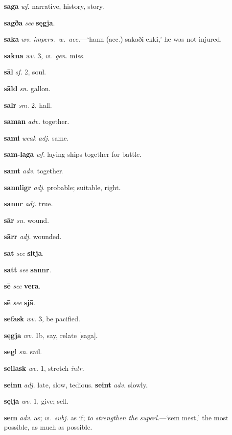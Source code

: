\documentclass[12pt,letterpaper]{book}
\begin{document}
\noindent
\textbf{saga} \textit{wf.} narrative, history, story.

\noindent
\textbf{sagða} \textit{} \textit{see} \textbf{sęgja}.

\noindent
\textbf{saka} \textit{wv.} \textit{impers.\ w.\ acc.}---`hann (acc.) sakaði
	ekki,' he was not injured.

\noindent
\textbf{sakna} \textit{wv.} 3, \textit{w.\ gen.} miss.

\noindent
\textbf{sāl} \textit{sf.} 2, soul.

\noindent
\textbf{sāld} \textit{sn.} gallon.

\noindent
\textbf{salr} \textit{sm.} 2, hall.

\noindent
\textbf{saman} \textit{adv.} together.

\noindent
\textbf{sami} \textit{weak adj.} same.

\noindent
\textbf{sam-laga} \textit{wf.} laying ships together for battle.

\noindent
\textbf{samt} \textit{adv.} together.

\noindent
\textbf{sannligr} \textit{adj.} probable; suitable, right.

\noindent
\textbf{sannr} \textit{adj.} true.

\noindent
\textbf{sār} \textit{sn.} wound.

\noindent
\textbf{sārr} \textit{adj.} wounded.

\noindent
\textbf{sat} \textit{} \textit{see} \textbf{sitja}.

\noindent
\textbf{satt} \textit{} \textit{see} \textbf{sannr}.

\noindent
\textbf{sē} \textit{} \textit{see} \textbf{vera}.

\noindent
\textbf{sē} \textit{} \textit{see} \textbf{sjā}.

\noindent
\textbf{sefask} \textit{wv.} 3, be pacified.

\noindent
\textbf{sęgja} \textit{wv.} 1b, say, relate [saga].

\noindent
\textbf{segl} \textit{sn.} sail.

\noindent
\textbf{seilask} \textit{wv.} 1, stretch \textit{intr.}

\noindent
\textbf{seinn} \textit{adj.} late, slow, tedious.  \textbf{seint}
	\textit{adv.} slowly.

\noindent
\textbf{sęlja} \textit{wv.} 1, give; sell.

\noindent
\textbf{sem} \textit{adv.} as; \textit{w.\ subj.} as if; \textit{to strengthen
	the superl.}---`sem mest,' the most possible, as much as possible.
\end{document}
